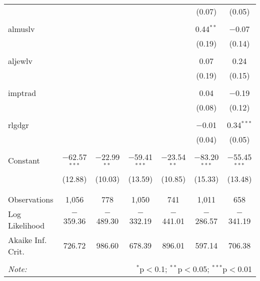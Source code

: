 \begin{table}[!htbp]
\begin{tabular}{@{\extracolsep{5pt}}lcccccc}
  &  &  &  &  & (0.07) & (0.05) \\ 
  & & & & & & \\ 
 almuslv &  &  &  &  & 0.44$^{**}$ & $-$0.07 \\ 
  &  &  &  &  & (0.19) & (0.14) \\ 
  & & & & & & \\ 
 aljewlv &  &  &  &  & 0.07 & 0.24 \\ 
  &  &  &  &  & (0.19) & (0.15) \\ 
  & & & & & & \\ 
 imptrad &  &  &  &  & 0.04 & $-$0.19 \\ 
  &  &  &  &  & (0.08) & (0.12) \\ 
  & & & & & & \\ 
 rlgdgr &  &  &  &  & $-$0.01 & 0.34$^{***}$ \\ 
  &  &  &  &  & (0.04) & (0.05) \\ 
  & & & & & & \\ 
 Constant & $-$62.57$^{***}$ & $-$22.99$^{**}$ & $-$59.41$^{***}$ & $-$23.54$^{**}$ & $-$83.20$^{***}$ & $-$55.45$^{***}$ \\ 
  & (12.88) & (10.03) & (13.59) & (10.85) & (15.33) & (13.48) \\ 
  & & & & & & \\ 
\hline \\[-1.8ex] 
Observations & 1,056 & 778 & 1,050 & 741 & 1,011 & 658 \\ 
Log Likelihood & $-$359.36 & $-$489.30 & $-$332.19 & $-$441.01 & $-$286.57 & $-$341.19 \\ 
Akaike Inf. Crit. & 726.72 & 986.60 & 678.39 & 896.01 & 597.14 & 706.38 \\ 
\hline 
\hline \\[-1.8ex] 
\textit{Note:}  & \multicolumn{6}{r}{$^{*}$p$<$0.1; $^{**}$p$<$0.05; $^{***}$p$<$0.01} \\ 
\end{tabular} 
\end{table} 
